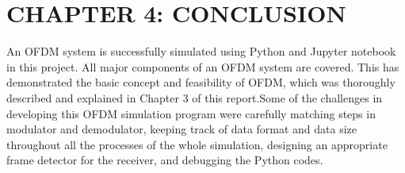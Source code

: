 \section*{CHAPTER 4: CONCLUSION}
\setcounter{section}{4}
\setcounter{subsection}{0}
\setcounter{figure}{0}
\setcounter{table}{0}

An OFDM system is successfully simulated using Python and Jupyter notebook in this project. All major components of an OFDM system are covered. This has demonstrated the basic concept and feasibility of OFDM, which was thoroughly described and explained in Chapter 3 of this report.Some of the challenges in developing this OFDM simulation program were carefully matching steps in modulator and demodulator, keeping track of data format and data size throughout all the processes of the whole simulation, designing an appropriate frame detector for the receiver, and debugging the Python codes.

\newpage